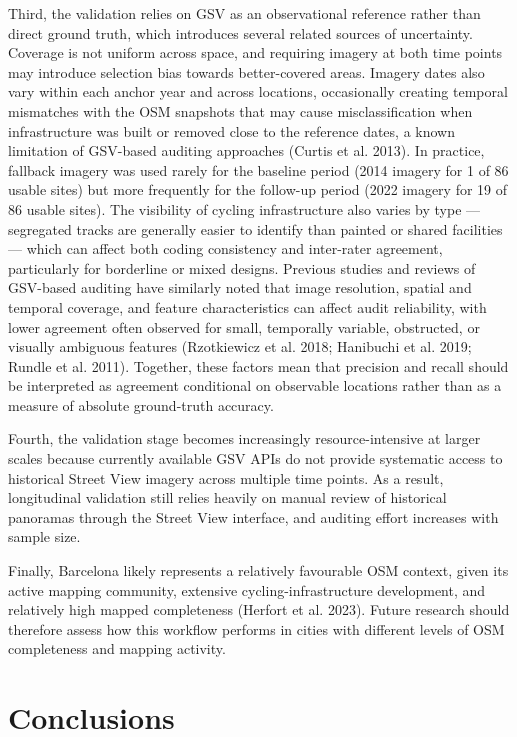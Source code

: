 \documentclass[
]{article}
\begin{document}
\color{black}Third, the validation relies on GSV as an observational
reference rather than direct ground truth, which introduces several
related sources of uncertainty. Coverage is not uniform across space,
and requiring imagery at both time points may introduce selection bias
towards better-covered areas. Imagery dates also vary within each anchor
year and across locations, occasionally creating temporal mismatches
with the OSM snapshots that may cause misclassification when
infrastructure was built or removed close to the reference dates, a
known limitation of GSV-based auditing approaches (Curtis et al. 2013).
In practice, fallback imagery was used rarely for the baseline period
(2014 imagery for 1 of 86 usable sites) but more frequently for the
follow-up period (2022 imagery for 19 of 86 usable sites). The
visibility of cycling infrastructure also varies by type --- segregated
tracks are generally easier to identify than painted or shared
facilities --- which can affect both coding consistency and inter-rater
agreement, particularly for borderline or mixed designs. Previous
studies and reviews of GSV-based auditing have similarly noted that
image resolution, spatial and temporal coverage, and feature
characteristics can affect audit reliability, with lower agreement often
observed for small, temporally variable, obstructed, or visually
ambiguous features (Rzotkiewicz et al. 2018; Hanibuchi et al. 2019;
Rundle et al. 2011). Together, these factors mean that precision and
recall should be interpreted as agreement conditional on observable
locations rather than as a measure of absolute ground-truth
accuracy.\color{black}

\color{black}Fourth, the validation stage becomes increasingly
resource-intensive at larger scales because currently available GSV APIs
do not provide systematic access to historical Street View imagery
across multiple time points. As a result, longitudinal validation still
relies heavily on manual review of historical panoramas through the
Street View interface, and auditing effort increases with sample
size.\color{black}

Finally, Barcelona likely represents a relatively favourable OSM
context, given its active mapping community, extensive
cycling-infrastructure development, and relatively high mapped
completeness (Herfort et al. 2023). Future research should therefore
assess how this workflow performs in cities with different levels of OSM
completeness and mapping activity.

\section{Conclusions}\label{conclusions}
\end{document}
